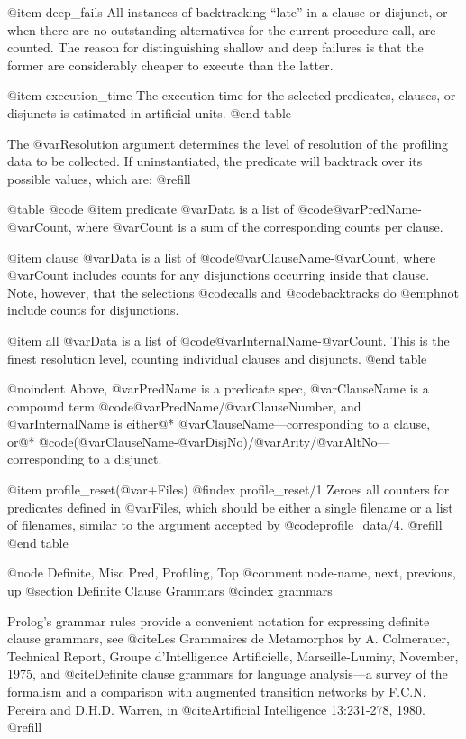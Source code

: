 @item deep_fails
All instances of backtracking ``late'' in a clause or disjunct, or when
there are no outstanding alternatives for the current procedure call,
are counted.  The reason for distinguishing shallow and deep failures is
that the former are considerably cheaper to execute than the latter.

@item execution_time
The execution time for the selected predicates, clauses, or disjuncts is
estimated in artificial units.
@end table

The @var{Resolution} argument determines the level of resolution of the
profiling data to be collected.  If uninstantiated, the predicate will
backtrack over its possible values, which are: @refill

@table @code
@item predicate
@var{Data} is a list of @code{@var{PredName}-@var{Count}}, where
@var{Count} is a sum of the corresponding counts per clause.

@item clause
@var{Data} is a list of @code{@var{ClauseName}-@var{Count}}, where
@var{Count} includes counts for any disjunctions occurring inside that
clause.  Note, however, that the selections @code{calls} and
@code{backtracks} do @emph{not} include counts for disjunctions.

@item all
@var{Data} is a list of @code{@var{InternalName}-@var{Count}}.  This is
the finest resolution level, counting individual clauses and disjuncts.
@end table

@noindent
Above, @var{PredName} is a predicate spec, @var{ClauseName} is a compound
term @code{@var{PredName}/@var{ClauseNumber}}, and @var{InternalName} is
either@*
@var{ClauseName}---corresponding to a clause, or@*
@code{(@var{ClauseName}-@var{DisjNo})/@var{Arity}/@var{AltNo}}---corresponding
to a disjunct.

@item profile_reset(@var{+Files})
@findex profile_reset/1
Zeroes all counters for predicates defined in @var{Files}, which should
be either a single filename or a list of filenames, similar to the
argument accepted by @code{profile_data/4}. @refill
@end table

@node Definite, Misc Pred, Profiling, Top
@comment  node-name,  next,  previous,  up
@section Definite Clause Grammars
@cindex grammars

Prolog's grammar rules provide a convenient notation for expressing
definite clause grammars, see @cite{Les Grammaires de Metamorphos} by A.
Colmerauer, Technical Report, Groupe d'Intelligence Artificielle,
Marseille-Luminy, November, 1975, and @cite{Definite clause grammars for
language analysis---a survey of the formalism and a comparison with
augmented transition networks} by F.C.N. Pereira and D.H.D. Warren, in
@cite{Artificial Intelligence} 13:231-278, 1980. @refill

